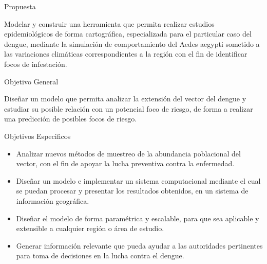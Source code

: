 \begin{frame}[c]{Propuesta}
    \begin{center}
    Modelar y construir una herramienta que permita realizar estudios epidemiológicos de forma
    cartográfica, especializada para el particular caso del dengue, mediante la simulación de
    comportamiento del Aedes aegypti sometido a las variaciones climáticas correspondientes a la
    región con el fin de identificar focos de infestación.
    \end{center}
\end{frame}


\begin{frame}[c]{Objetivo General}
    \begin{center}
    Diseñar un modelo que permita analizar la extensión del vector del dengue y estudiar su posible
    relación con un potencial foco de riesgo, de forma a realizar una predicción de posibles focos
    de riesgo.
    \end{center}
\end{frame}


\begin{frame}[t]{Objetivos Especificos}
    \begin{center}

        \begin{itemize}
        \item Analizar nuevos métodos de muestreo de la abundancia poblacional del vector, con el fin de apoyar la lucha preventiva contra la enfermedad.

        \item Diseñar un modelo e implementar un sistema computacional mediante el cual se puedan procesar y presentar los resultados obtenidos, en un sistema de información geográfica.

        \item Diseñar el modelo de forma paramétrica y escalable, para que sea aplicable y extensible a cualquier región o área de estudio.

        \item Generar información relevante que pueda ayudar a las autoridades pertinentes para toma de decisiones en la lucha contra el dengue.
        \end{itemize}
    \end{center}
\end{frame}
